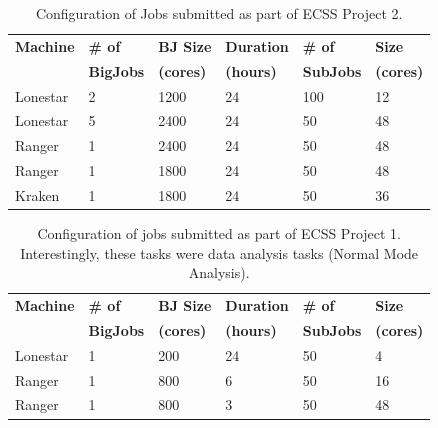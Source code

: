 \documentclass{sig-alternate}
\begin{document}

\begin{table}[h]
\begin{center}
\begin{tabular}{p{1.1cm}p{1.2cm}p{1.2cm}p{1.2cm}p{1.1cm}p{0.8cm}}
\toprule
\textbf{Machine}  & 
\textbf{\# of}    &
\textbf{BJ Size} & 
\textbf{Duration} & 
\textbf{\# of}    &
\textbf{Size}     \\
                 &
\textbf{BigJobs} &
\textbf{(cores)} &
\textbf{(hours)} &
\textbf{SubJobs} &
\textbf{(cores)} 
                  \\ \midrule
Lonestar & 2 & 1200 & 24 & 100 & 12 \\ \midrule
Lonestar & 5 & 2400 & 24 &  50 & 48 \\ \midrule
Ranger   & 1 & 2400 & 24 &  50 & 48 \\ \midrule
Ranger   & 1 & 1800 & 24 &  50 & 48 \\ \midrule
Kraken   & 1 & 1800 & 24 &  50 & 36 \\ \bottomrule
\end{tabular}
\caption{Configuration of Jobs submitted as part of ECSS Project
  2.}
\label{table:results1}
\end{center}
\end{table}


\begin{table}[h]
\begin{center}
\begin{tabular}{p{1.1cm}p{1.2cm}p{1.2cm}p{1.2cm}p{1.1cm}p{0.8cm}}
\toprule
\textbf{Machine}  & 
\textbf{\# of}    &
\textbf{BJ Size}     & 
\textbf{Duration} & 
\textbf{\# of}    &
\textbf{Size}     \\
                  &
\textbf{BigJobs}  &
\textbf{(cores)} &
\textbf{(hours)}  &
\textbf{SubJobs}  &
\textbf{(cores)} 
                  \\ \midrule
Lonestar & 1 &  200 & 24 &  50 &  4 \\ \midrule
Ranger   & 1 &  800 &  6 &  50 & 16 \\ \midrule
Ranger   & 1 &  800 &  3 &  50 & 48 \\ \bottomrule
\end{tabular}
\caption{Configuration of jobs submitted as part of ECSS Project
  1. Interestingly, these tasks were data analysis tasks (Normal Mode
  Analysis).}
\label{table:results}
\end{center}
 \end{table}
\end{document}
